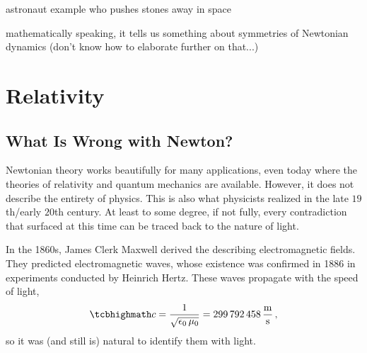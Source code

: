 \documentclass[../relativity_main.tex]{subfiles}
\begin{document}
\begin{ex}
astronaut example who pushes stones away in space
\end{ex}


mathematically speaking, it tells us something about symmetries of Newtonian dynamics (don't know how to elaborate further on that...)

\newpage



	\section{Relativity}
		\subsection{What Is Wrong with Newton?}
Newtonian theory works beautifully for many applications, even today where the theories of relativity and quantum mechanics are available. However, it does not describe the entirety of physics. This is also what physicists realized in the late $19$th/early $20$th century. At least to some degree, if not fully, every contradiction that surfaced at this time can be traced back to the nature of light.

In the 1860s, James Clerk Maxwell derived the  describing electromagnetic fields. They predicted electromagnetic waves, whose existence was confirmed in 1886 in experiments conducted by Heinrich Hertz. These waves propagate with the speed of light,
\begin{equation}\label{eq:speed_of_light}
	\eqbox{
	c = \frac{1}{\sqrt{\epsilon_0 \, \mu_0}} = 299 \, 792 \, 458 \, \frac{\metre}{\second}
	} \, ,
\end{equation}
so it was (and still is) natural to identify them with light.
\end{document}
